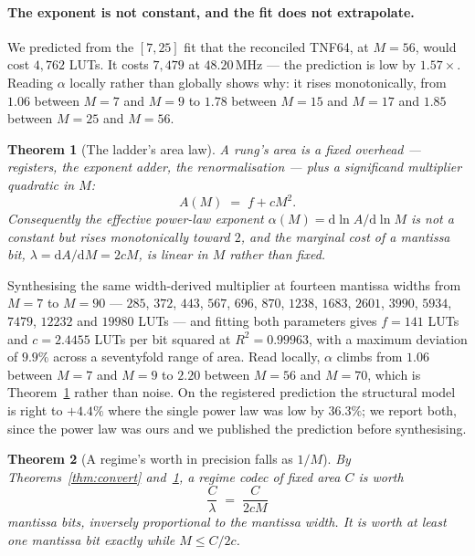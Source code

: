 \documentclass[11pt]{article}
\newtheorem{theorem}{Theorem}
\theoremstyle{definition}
\begin{document}
\paragraph{The exponent is not constant, and the fit does not extrapolate.} We
predicted from the $[7,25]$ fit that the reconciled TNF64, at $M = 56$, would
cost $4{,}762$ LUTs. It costs $7{,}479$ at $48.20$\,MHz --- the prediction is low
by $1.57\times$. Reading $\alpha$ locally rather than globally shows why: it rises
monotonically, from $1.06$ between $M{=}7$ and $M{=}9$ to $1.78$ between $M{=}15$
and $M{=}17$ and $1.85$ between $M{=}25$ and $M{=}56$.

\begin{theorem}[The ladder's area law]
\label{thm:alpha}
A rung's area is a fixed overhead --- registers, the exponent adder, the
renormalisation --- plus a significand multiplier quadratic in $M$:
\[
A(M) \;=\; f + cM^{2}.
\]
Consequently the effective power-law exponent
$\alpha(M) = \mathrm{d}\ln A/\mathrm{d}\ln M$ is not a constant but rises
monotonically toward $2$, and the marginal cost of a mantissa bit,
$\lambda = \mathrm{d}A/\mathrm{d}M = 2cM$, is \emph{linear} in $M$ rather than
fixed.
\end{theorem}

Synthesising the same width-derived multiplier at fourteen mantissa widths from
$M{=}7$ to $M{=}90$ --- $285$, $372$, $443$, $567$, $696$, $870$, $1238$, $1683$,
$2601$, $3990$, $5934$, $7479$, $12232$ and $19980$ LUTs --- and fitting both
parameters gives $f = 141$ LUTs and $c = 2.4455$ LUTs per bit squared at
$R^2 = 0.99963$, with a maximum deviation of $9.9\%$ across a seventyfold range of
area. Read locally, $\alpha$ climbs from $1.06$ between $M{=}7$ and $M{=}9$ to
$2.20$ between $M{=}56$ and $M{=}70$, which is Theorem~\ref{thm:alpha} rather than
noise. On the registered prediction the structural model is right to $+4.4\%$
where the single power law was low by $36.3\%$; we report both, since the power
law was ours and we published the prediction before synthesising.

\begin{theorem}[A regime's worth in precision falls as $1/M$]
\label{thm:oneoverm}
By Theorems~\ref{thm:convert} and~\ref{thm:alpha}, a regime codec of fixed area
$C$ is worth
\[
\frac{C}{\lambda} \;=\; \frac{C}{2cM}
\]
mantissa bits, inversely proportional to the mantissa width. It is worth at least
one mantissa bit exactly while $M \leq C/2c$.
\end{theorem}
\end{document}
